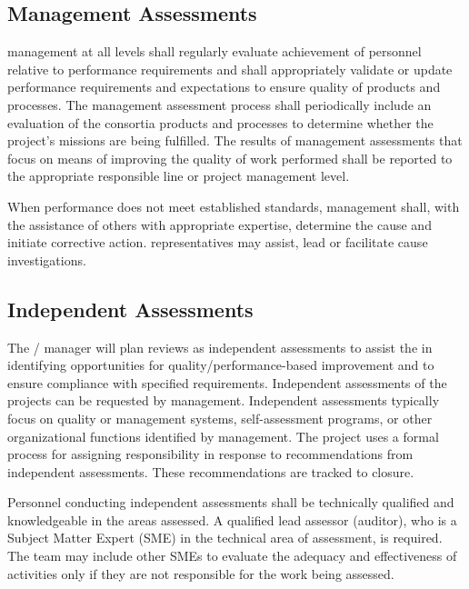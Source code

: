 \subsection{Management Assessments}

 management at all levels shall regularly evaluate
achievement of personnel relative to performance requirements and
shall appropriately validate or update performance requirements and
expectations to ensure quality of products and processes. The
management assessment process shall periodically include an evaluation
of the consortia products and processes to determine whether the
project's missions are being fulfilled. The results of management
assessments that focus on means of improving the quality of work
performed shall be reported to the appropriate responsible line or
project management level.

When performance does not meet established standards, management
shall, with the assistance of others with appropriate expertise,
determine the cause and initiate corrective action. 
representatives may assist, lead or facilitate cause investigations.

\subsection{Independent Assessments}

The /  manager will plan reviews as
independent assessments to assist the   in
identifying opportunities for quality/performance-based improvement
and to ensure compliance with specified requirements. Independent
assessments of the  projects can be requested by
 management. Independent assessments typically focus on
quality or  management systems, self-assessment programs, or
other organizational functions identified by management. The
 project uses a formal process for assigning
responsibility in response to recommendations from independent
assessments. These recommendations are tracked to closure.

Personnel conducting independent assessments shall be technically
qualified and knowledgeable in the areas assessed. A qualified lead
assessor (auditor), who is a Subject Matter Expert (SME) in the
technical area of assessment, is required. The team may include other
SMEs to evaluate the adequacy and effectiveness of activities only if
they are not responsible for the work being assessed.

